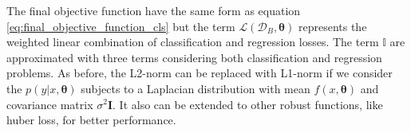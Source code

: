 \documentclass{article}
\begin{document}
The final objective function have the same form as equation \ref{eq:final_objective_function_cls}
but the term $\mathcal L(\mathcal D_B, \boldsymbol{\theta})$
represents the weighted linear combination of classification and regression losses.
The term $\mathbb{I}$ are approximated
with three terms considering both classification and regression problems.
As before, the L2-norm can be replaced with L1-norm if we consider
the $p(y|x, \boldsymbol{\theta})$ subjects to a Laplacian distribution 
with mean $f(x, \boldsymbol{\theta})$ and covariance matrix $\sigma^2\boldsymbol{I}$.
It also can be extended to other robust functions, like huber loss, for better performance.



\end{document}
